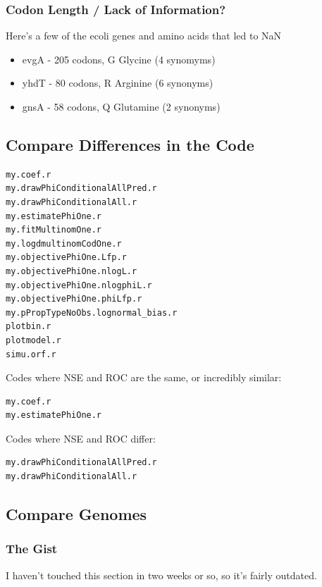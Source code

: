 \subsubsection{Codon Length / Lack of Information?}

Here's a few of the ecoli genes and amino acids that led to NaN
\begin{itemize}
\item evgA - 205 codons, G Glycine (4 synomyms)
\item yhdT - 80 codons, R Arginine (6 synonyms)
\item gnsA - 58 codons, Q Glutamine (2 synonyms)
\end{itemize}






\newpage
\subsection{Compare Differences in the Code}
\begin{verbatim}
my.coef.r
my.drawPhiConditionalAllPred.r
my.drawPhiConditionalAll.r
my.estimatePhiOne.r
my.fitMultinomOne.r
my.logdmultinomCodOne.r
my.objectivePhiOne.Lfp.r
my.objectivePhiOne.nlogL.r
my.objectivePhiOne.nlogphiL.r
my.objectivePhiOne.phiLfp.r
my.pPropTypeNoObs.lognormal_bias.r
plotbin.r
plotmodel.r
simu.orf.r
\end{verbatim}


Codes where NSE and ROC are the same, or incredibly similar:
\begin{verbatim}
my.coef.r
my.estimatePhiOne.r
\end{verbatim}

Codes where NSE and ROC differ:
\begin{verbatim}
my.drawPhiConditionalAllPred.r
my.drawPhiConditionalAll.r
\end{verbatim}





\newpage
\subsection{Compare Genomes}

\subsubsection{The Gist}

I haven't touched this section in two weeks or so, so it's fairly outdated.


